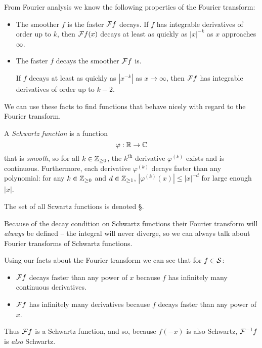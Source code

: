     From Fourier analysis we know the following properties of the Fourier transform: 
    \begin{itemize}
      \item The smoother $f$ is the faster $\F f$ decays.
        If $f$ has integrable derivatives of order up to $k$, then $\F f(x)$ decays at least as quickly as $|x|^{-k}$ as $x$ approaches $\infty$.
      \item The faster $f$ decays the smoother $\F f$ is.

        If $f$ decays at least as quickly as $|x^{-k}|$ as $x\rightarrow\infty$, then $\F f$ has integrable derivatives of order up to $k-2$. %
    \end{itemize}
    We can use these facts to find functions that behave nicely with regard to the Fourier transform.
    \begin{defn}
      A \emph{Schwartz function} is a function
      \begin{equation*}
        \varphi:\R\rightarrow\C
      \end{equation*}
      that is \emph{smooth}, so for all $k\in\Z_{\ge0}$, the $k^\text{th}$ derivative $\varphi^{(k)}$ exists and is continuous.
      Furthermore, each derivative $\varphi^{(k)}$ decays faster than any polynomial: for any $k\in\Z_{\ge0}$ and $d\in\Z_{\ge1}$, $|\varphi^{(k)}(x)|\le|x|^{-d}$ for large enough $|x|$.

      The set of all Scwartz functions is denoted \S.
    \end{defn}
    Because of the decay condition on Schwartz functions their Fourier transform will \emph{always} be defined -- the integral will never diverge, so we can always talk about Fourier transforms of Schwartz functions.

    Using our facts about the Fourier transform we can see that for $f\in\S$:
    \begin{itemize}
      \item $\F f$ decays faster than any power of $x$ because $f$ has infinitely many continuous derivatives.
      \item $\F f$ has infinitely many derivatives because $f$ decays faster than any power of $x$.
    \end{itemize}
    Thus $\F f$ is a Schwartz function, and so, because $f(-x)$ is also Schwartz, $\F^{-1}f$ is \emph{also} Schwartz.

